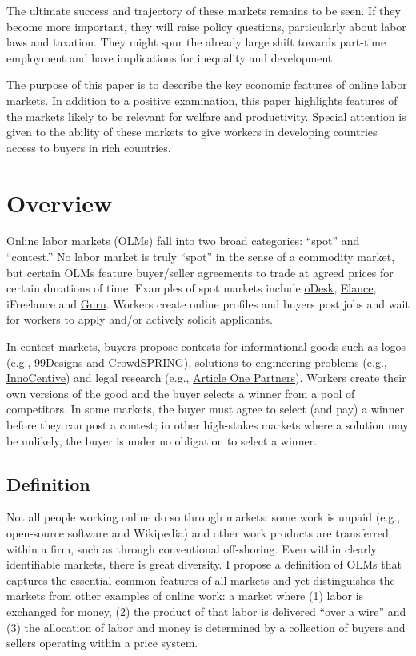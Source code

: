\documentclass{llncs}
\begin{document}
The ultimate success and trajectory of these markets remains to be
seen. If they become more important, they will raise policy
questions, particularly about labor laws and taxation. They might spur
the already large shift towards part-time employment \cite{oecd2010}
and have implications for inequality and development. 

The purpose of
this paper is to describe the key economic features of online labor
markets. In addition to a positive examination, this paper highlights
features of the markets likely to be relevant for welfare and
productivity. Special attention is given to the ability of these
markets to give workers in developing countries access to buyers in
rich countries.

\section{Overview} 
Online labor markets (OLMs) fall into two broad categories: ``spot''
and ``contest.'' No labor market is truly ``spot'' in the sense of a
commodity market, but certain OLMs feature buyer/seller agreements to trade at agreed prices for certain durations of
time. Examples of spot markets include \href{http://www.oDesk.com}{oDesk},
\href{http://www.Elance.com}{Elance}, iFreelance and
\href{http://www.Guru.com}{Guru}. Workers create online profiles and
buyers post jobs and wait for workers to apply and/or actively
solicit applicants.

In contest markets, buyers propose contests for informational goods
such as logos (e.g., \href{99Designs.com}{99Designs} and
\href{http://www.crowdspring.com/}{CrowdSPRING}), solutions to
engineering problems (e.g.,
\href{http://www.innocentive.com/}{InnoCentive}) and legal research
(e.g., \href{http://www.articleonepartners.com/}{Article One
  Partners}). Workers create their own versions of the good and
the buyer selects a winner from a pool of competitors. In some markets,
the buyer must agree to select (and pay) a winner before they can
post a contest; in other high-stakes markets where a solution may
be unlikely, the buyer is under no obligation to select a winner.

\subsection{Definition} 
Not all people working online do so through markets: some work is
unpaid (e.g., open-source software and Wikipedia) and other work products
are transferred within a firm, such as through conventional
off-shoring. Even within clearly identifiable markets, there is great
diversity. I propose a definition of OLMs that captures the essential
common features of all markets and yet distinguishes the markets from
other examples of online work: a market where (1) labor is exchanged
for money, (2) the product of that labor is delivered ``over a wire''
and (3) the allocation of labor and money is determined by a
collection of buyers and sellers operating within a price system.
\end{document}
